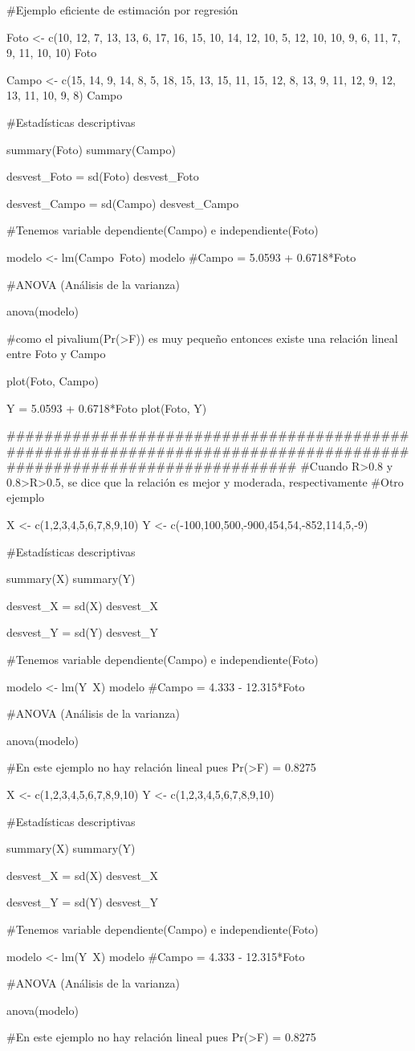 #Ejemplo eficiente de estimación por regresión

Foto <- c(10, 12, 7, 13, 13, 6, 17, 16, 15, 10, 14, 12, 10, 5, 12, 10, 10, 9, 6, 11, 7, 9, 11, 10, 10)
Foto

Campo <- c(15, 14, 9, 14, 8, 5, 18, 15, 13, 15, 11, 15, 12, 8, 13, 9, 11, 12, 9, 12, 13, 11, 10, 9, 8)
Campo

#Estadísticas descriptivas

summary(Foto)
summary(Campo)

desvest_Foto = sd(Foto)
desvest_Foto

desvest_Campo = sd(Campo)
desvest_Campo

#Tenemos variable dependiente(Campo) e independiente(Foto)

modelo <- lm(Campo~Foto)
modelo                    #Campo = 5.0593 + 0.6718*Foto

#ANOVA (Análisis de la varianza)

anova(modelo)

#como el pivalium(Pr(>F)) es muy pequeño entonces existe una relación lineal entre Foto y Campo

plot(Foto, Campo)

Y = 5.0593 + 0.6718*Foto
plot(Foto, Y)


#####################################################################################################################
#Cuando R>0.8 y 0.8>R>0.5, se dice que la relación es mejor y moderada, respectivamente
#Otro ejemplo

X <- c(1,2,3,4,5,6,7,8,9,10)
Y <- c(-100,100,500,-900,454,54,-852,114,5,-9)

#Estadísticas descriptivas

summary(X)
summary(Y)

desvest_X = sd(X)
desvest_X

desvest_Y = sd(Y)
desvest_Y

#Tenemos variable dependiente(Campo) e independiente(Foto)

modelo <- lm(Y~X)
modelo                    #Campo = 4.333 - 12.315*Foto

#ANOVA (Análisis de la varianza)

anova(modelo)

#En este ejemplo no hay relación lineal pues Pr(>F) = 0.8275

X <- c(1,2,3,4,5,6,7,8,9,10)
Y <- c(1,2,3,4,5,6,7,8,9,10)

#Estadísticas descriptivas

summary(X)
summary(Y)

desvest_X = sd(X)
desvest_X

desvest_Y = sd(Y)
desvest_Y

#Tenemos variable dependiente(Campo) e independiente(Foto)

modelo <- lm(Y~X)
modelo                    #Campo = 4.333 - 12.315*Foto

#ANOVA (Análisis de la varianza)

anova(modelo)

#En este ejemplo no hay relación lineal pues Pr(>F) = 0.8275
